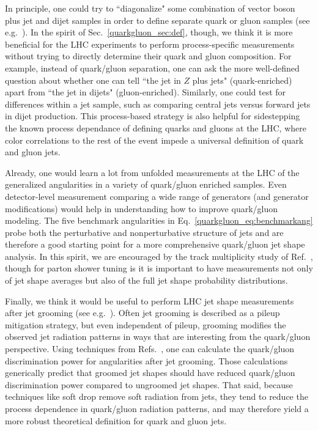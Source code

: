 \documentclass[11pt]{cernrep}
\begin{document}
In principle, one could try to ``diagonalize" some combination of vector boson plus jet and dijet samples in order to define separate quark or gluon samples (see e.g.~\cite{Aad:2014gea}).  In the spirit of Sec.~\ref{quarkgluon_sec:def}, though, we think it is more beneficial for the LHC experiments to perform process-specific measurements without trying to directly determine their quark and gluon composition.  For example, instead of quark/gluon separation, one can ask the more well-defined question about whether one can tell ``the jet in $Z$ plus jets" (quark-enriched) apart from ``the jet in dijets" (gluon-enriched).  Similarly, one could test for differences within a jet sample, such as comparing central jets versus forward jets in dijet production.  This process-based strategy is also helpful for sidestepping the known process dependance of defining quarks and gluons at the LHC, where color correlations to the rest of the event impede a universal definition of quark and gluon jets.

Already, one would learn a lot from unfolded measurements at the LHC  of the generalized angularities in a variety of quark/gluon enriched samples.  Even detector-level measurement comparing a wide range of generators (and generator modifications) would help in understanding how to improve quark/gluon modeling.   The five benchmark angularities in Eq.~\eqref{quarkgluon_eq:benchmarkang} probe both the perturbative and nonperturbative structure of jets and are therefore a good starting point for a more comprehensive quark/gluon jet shape analysis.  In this spirit, we are encouraged by the track multiplicity study of Ref.~\cite{Aad:2016oit}, though for parton shower tuning is it is important to have measurements not only of jet shape averages but also of the full jet shape probability distributions.

Finally, we think it would be useful to perform LHC jet shape measurements after jet grooming (see e.g.~\cite{Butterworth:2008iy,Ellis:2009su,Ellis:2009me,Krohn:2009th}).  Often jet grooming is described as a pileup mitigation strategy, but even independent of pileup, grooming modifies the observed jet radiation patterns in ways that are interesting from the quark/gluon perspective.  Using techniques from Refs.~\cite{Dasgupta:2013ihk,Larkoski:2014wba}, one can calculate the quark/gluon discrimination power for angularities after jet grooming.  Those calculations generically predict that groomed jet shapes should have reduced quark/gluon discrimination power compared to ungroomed jet shapes.  That said, because techniques like soft drop \cite{Larkoski:2014wba} remove soft radiation from jets, they tend to reduce the process dependence in quark/gluon radiation patterns, and may therefore yield a more robust theoretical definition for quark and gluon jets.
\end{document}
